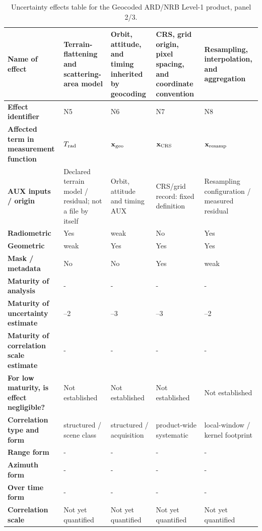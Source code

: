 \begin{table}[p]
\centering\scriptsize
\renewcommand{\arraystretch}{1.1}
\caption{Uncertainty effects table for the Geocoded ARD/NRB Level-1 product, panel 2/3.}
\label{tab:nrb_effects_table_proposed_2}
\begin{tabularx}{\textwidth}{|>{\raggedright\arraybackslash}p{3.0cm}|*{4}{>{\raggedright\arraybackslash}X|}}\hline
\textbf{Name of effect} & Terrain-flattening and scattering-area model & Orbit, attitude, and timing inherited by geocoding & CRS, grid origin, pixel spacing, and coordinate convention & Resampling, interpolation, and aggregation \\ \hline
\textbf{Effect identifier} & N5 & N6 & N7 & N8 \\ \hline
\textbf{Affected term in measurement function} & $T_{\rm rad}$ & $\mathbf x_{\rm geo}$ & $\mathbf x_{\rm CRS}$ & $\mathbf x_{\rm resamp}$ \\ \hline
\textbf{AUX inputs / origin} & Declared terrain model / residual; not a file by itself & Orbit, attitude and timing AUX & CRS/grid record: fixed definition & Resampling configuration / measured residual \\ \hline
\textbf{Radiometric} & Yes & weak & No & Yes \\ \hline
\textbf{Geometric} & weak & Yes & Yes & Yes \\ \hline
\textbf{Mask / metadata} & No & No & Yes & weak \\ \hline
\textbf{Maturity of analysis} & - & - & - & - \\ \hline
\textbf{Maturity of uncertainty estimate} & 1--2 & 2--3 & 2--3 & 1--2 \\ \hline
\textbf{Maturity of correlation scale estimate} & - & - & - & - \\ \hline
\textbf{For low maturity, is effect negligible?} & Not established & Not established & Not established & Not established \\ \hline
\textbf{Correlation type and form} & structured / scene class & structured / acquisition & product-wide systematic & local-window / kernel footprint \\ \hline
\textbf{Range form} & - & - & - & - \\ \hline
\textbf{Azimuth form} & - & - & - & - \\ \hline
\textbf{Over time form} & - & - & - & - \\ \hline
\textbf{Correlation scale} & Not yet quantified & Not yet quantified & Not yet quantified & Not yet quantified \\ \hline

\end{tabularx}
\end{table}
